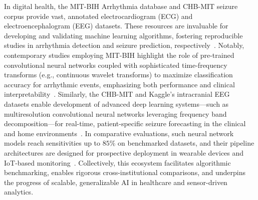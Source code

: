 \documentclass[sigconf]{acmart}
\begin{document}
In digital health, the MIT-BIH Arrhythmia database and CHB-MIT seizure corpus provide vast, annotated electrocardiogram (ECG) and electroencephalogram (EEG) datasets. These resources are invaluable for developing and validating machine learning algorithms, fostering reproducible studies in arrhythmia detection and seizure prediction, respectively~\cite{ref40,ref88,ref89,ref90,ref48,ref51,ref43,ref58,ref66,ref74,ref75,ref101,ref102,ref106}. Notably, contemporary studies employing MIT-BIH highlight the role of pre-trained convolutional neural networks coupled with sophisticated time-frequency transforms (e.g., continuous wavelet transforms) to maximize classification accuracy for arrhythmic events, emphasizing both performance and clinical interpretability~\cite{ref101}. Similarly, the CHB-MIT and Kaggle’s intracranial EEG datasets enable development of advanced deep learning systems---such as multiresolution convolutional neural networks leveraging frequency band decomposition---for real-time, patient-specific seizure forecasting in the clinical and home environments~\cite{ref102,ref103,ref106}. In comparative evaluations, such neural network models reach sensitivities up to $85\%$ on benchmarked datasets, and their pipeline architectures are designed for prospective deployment in wearable devices and IoT-based monitoring~\cite{ref102,ref103}. Collectively, this ecosystem facilitates algorithmic benchmarking, enables rigorous cross-institutional comparisons, and underpins the progress of scalable, generalizable AI in healthcare and sensor-driven analytics.
\end{document}
